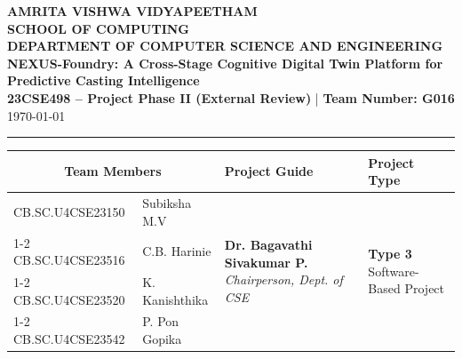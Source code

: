 \documentclass[11pt, a4paper]{article}
\begin{document}
\noindent
\begin{minipage}{\textwidth}
    \centering
    {\Large \textbf{\textcolor{amritaMaroon}{
    AMRITA VISHWA VIDYAPEETHAM \\
    SCHOOL OF COMPUTING \\
    DEPARTMENT OF COMPUTER SCIENCE AND ENGINEERING \\
    }}}
    \vspace{0.2cm}
    {\large \textbf{NEXUS-Foundry: A Cross-Stage Cognitive Digital Twin Platform for Predictive Casting Intelligence}} \\[0.1cm]
    \textbf{23CSE498 -- Project Phase II (External Review)} \quad | \quad \textbf{Team Number: G016} \\
    \today
\end{minipage}

\vspace{0.3cm}
\hrule
\vspace{0.3cm}

\noindent
\begin{center}
    \renewcommand{\arraystretch}{1.45}
    \setlength{\tabcolsep}{6pt}
    \begin{tabular}{|l|p{4.8cm}|p{4.6cm}|p{3.2cm}|}
        \hline
        \multicolumn{2}{|c|}{\textbf{Team Members}} & \textbf{Project Guide} & \textbf{Project Type} \\
        \hline
        \small CB.SC.U4CSE23150 & \small \raggedright Subiksha M.V &
        \multirow{4}{=}{\raggedright \small \textbf{Dr. Bagavathi Sivakumar P.} \newline \textit{Chairperson, \newline Dept. of CSE}} &
        \multirow{4}{=}{\raggedright \small \textbf{Type 3} \newline Software-Based Project} \\ \cline{1-2}
        \small CB.SC.U4CSE23516 & \small C.B. Harinie & & \\ \cline{1-2}
        \small CB.SC.U4CSE23520 & \small K. Kanishthika & & \\ \cline{1-2}
        \small CB.SC.U4CSE23542 & \small P. Pon Gopika & & \\
        \hline
    \end{tabular}
\end{center}
\vspace{0.2cm}

\end{document}
